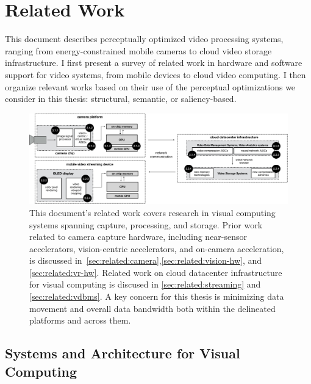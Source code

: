 \chapter{Related Work}\label{ch:related}

This document describes perceptually optimized video processing systems, ranging from energy-constrained mobile cameras to cloud video storage infrastructure. I first present a survey of related work in hardware and software support for video systems, from mobile devices to cloud video computing. I then organize relevant works based on their use of the perceptual optimizations we consider in this thesis: structural, semantic, or saliency-based.

\begin{figure}[h]
\centering
    \begin{center}
\includegraphics[width=\textwidth]{hfbs-figs/generals-related-work.pdf}
    \end{center}
    \caption{This document's related work covers research in visual computing systems spanning capture, processing, and storage. Prior work related to camera capture hardware, including near-sensor accelerators, vision-centric accelerators, and on-camera acceleration, is discussed in~\ref{sec:related:camera},\ref{sec:related:vision-hw}, and \ref{sec:related:vr-hw}. Related work on cloud datacenter infrastructure for visual computing is discused in \ref{sec:related:streaming} and \ref{sec:related:vdbms}. A key concern for this thesis is minimizing data movement and overall data bandwidth both within the delineated platforms and across them.}
    \label{fig:related-work}
\end{figure}


\section{Systems and Architecture for Visual Computing}

